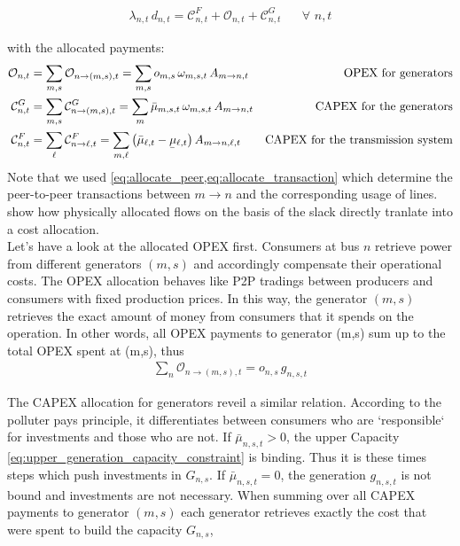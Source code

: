 \documentclass[11pt]{article}
\newcommand{\ubar}[1]{\underaccent{\bar}{#1}}
\newcommand{\generation}[1][n]{g_{#1,s,t}}
\newcommand{\generationshare}[1][n]{\omega_{#1,s,t}}
\newcommand{\capacityGeneration}{G_{n,s}}
\newcommand{\opexGeneration}[1][n]{o_{#1,s}}
\newcommand{\demandnodal}[1][n]{d_{#1,t}}
\newcommand{\muuppergeneration}[1][n]{\bar{\mu}_{#1,s,t}}
\newcommand{\mulowerflow}{\ubar{\mu}_{\ell,t}}
\newcommand{\muupperflow}{\bar{\mu}_{\ell,t}}
\newcommand{\lmp}[1][n]{\lambda_{#1,t}}
\newcommand{\allocatePeer}[1][m \rightarrow n]{A_{#1,t}}
\newcommand{\allocateTransaction}[1][m \rightarrow n]{A_{#1,\ell,t}}
\newcommand{\allocateCapexGeneration}[1][n]{\mathcal{C}^{G}_{#1,t}}
\newcommand{\allocateCapexFlow}[1][n]{\mathcal{C}^{F}_{#1,t}}
\newcommand{\allocateOpex}[1][n]{\mathcal{O}_{#1,t}}
\newcommand{\Forall}[1]{\hspace{20pt} \forall \,\, #1 }
\begin{document}
\begin{align}
 \lmp \, \demandnodal = \allocateCapexFlow + \allocateOpex + \allocateCapexGeneration \Forall{n,t}
 \label{eq:lmp_allocation}
\end{align}

with the allocated payments: \\
\begin{align}
 \allocateOpex &= 
 \sum_{m,s} \allocateOpex[n \rightarrow (m,s)]= 
 \sum_{m,s} \opexGeneration[m] \, \generationshare[m] \, \allocatePeer 
 &\text{OPEX for generators} 
\label{eq:allocate_opexGeneration}\\
 \allocateCapexGeneration &= 
 \sum_{m,s} \allocateCapexGeneration[n \rightarrow (m,s)] = 
 \sum_m \muuppergeneration[m] \, \generationshare[m] \, \allocatePeer
 &\text{CAPEX for the generators} 
\label{eq:allocate_capexGeneration} \\
 \allocateCapexFlow &=  
 \sum_{\ell} \allocateCapexFlow[n \rightarrow \ell] =  
 \sum_{m,\ell} \left( \muupperflow - \mulowerflow\right) \allocateTransaction  
 &\text{CAPEX for the transmission system} 
\label{eq:allocate_capexFlow}
\end{align}
Note that we used \cref{eq:allocate_peer,eq:allocate_transaction} which determine the peer-to-peer transactions between $m \rightarrow n$ and the corresponding usage of lines.  show how physically allocated flows on the basis of the slack directly tranlate into a cost allocation.\\ 

Let's have a look at the allocated OPEX first. Consumers at bus $n$ retrieve power from different generators $(m,s)$ and accordingly compensate their operational costs. The OPEX allocation behaves like P2P tradings between producers and consumers with fixed production prices. In this way, the generator $(m,s)$ retrieves the exact amount of money from consumers that it spends on the operation. In other words, all OPEX payments to generator (m,s) sum up to the total OPEX spent at (m,s), thus 
\begin{align}
\sum_{n} \allocateOpex[n \rightarrow (m,s)] = \opexGeneration \, \generation
\label{eq:no_profit_opex}
\end{align}


The CAPEX allocation for generators reveil a similar relation. According to the polluter pays principle, it differentiates between consumers who are `responsible` for investments and those who are not. If $\muuppergeneration > 0$, the upper Capacity \cref{eq:upper_generation_capacity_constraint} is binding. Thus it is these times steps which push investments in $\capacityGeneration$. If $\muuppergeneration = 0$, the generation $\generation$ is not bound and investments are not necessary. 
When summing over all CAPEX payments to generator $(m,s)$ each generator retrieves exactly the cost that were spent to build the capacity $\capacityGeneration$,
\end{document}
